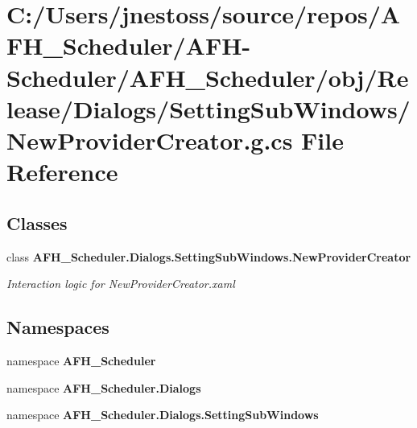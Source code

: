\section{C\+:/\+Users/jnestoss/source/repos/\+A\+F\+H\+\_\+\+Scheduler/\+A\+F\+H-\/\+Scheduler/\+A\+F\+H\+\_\+\+Scheduler/obj/\+Release/\+Dialogs/\+Setting\+Sub\+Windows/\+New\+Provider\+Creator.g.\+cs File Reference}
\label{_release_2_dialogs_2_setting_sub_windows_2_new_provider_creator_8g_8cs}
\subsection*{Classes}
\begin{DoxyCompactItemize}
\item 
class \textbf{ A\+F\+H\+\_\+\+Scheduler.\+Dialogs.\+Setting\+Sub\+Windows.\+New\+Provider\+Creator}
\begin{DoxyCompactList}\small\item\em Interaction logic for New\+Provider\+Creator.\+xaml \end{DoxyCompactList}\end{DoxyCompactItemize}
\subsection*{Namespaces}
\begin{DoxyCompactItemize}
\item 
namespace \textbf{ A\+F\+H\+\_\+\+Scheduler}
\item 
namespace \textbf{ A\+F\+H\+\_\+\+Scheduler.\+Dialogs}
\item 
namespace \textbf{ A\+F\+H\+\_\+\+Scheduler.\+Dialogs.\+Setting\+Sub\+Windows}
\end{DoxyCompactItemize}
